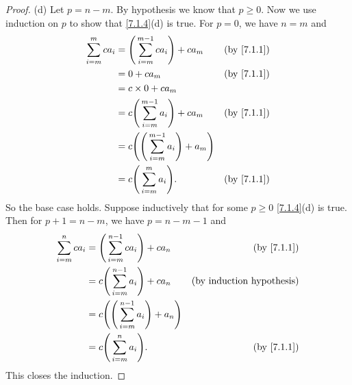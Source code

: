 \begin{proof}{(d)}
  Let \(p = n - m\).
  By hypothesis we know that \(p \geq 0\).
  Now we use induction on \(p\) to show that \cref{7.1.4}(d) is true.
  For \(p = 0\), we have \(n = m\) and
  \begin{align*}
    \sum_{i = m}^m ca_i & = \Bigg(\sum_{i = m}^{m - 1} ca_i\Bigg) + ca_m             & \text{(by \cref{7.1.1})} \\
                        & = 0 + ca_m                                                 & \text{(by \cref{7.1.1})} \\
                        & = c \times 0 + ca_m                                                                   \\
                        & = c \Bigg(\sum_{i = m}^{m - 1} a_i\Bigg) + ca_m            & \text{(by \cref{7.1.1})} \\
                        & = c \Bigg(\Bigg(\sum_{i = m}^{m - 1} a_i\Bigg) + a_m\Bigg)                            \\
                        & = c \Bigg(\sum_{i = m}^m a_i\Bigg).                        & \text{(by \cref{7.1.1})}
  \end{align*}
  So the base case holds.
  Suppose inductively that for some \(p \geq 0\) \cref{7.1.4}(d) is true.
  Then for \(p + 1 = n - m\), we have \(p = n - m - 1\) and
  \begin{align*}
    \sum_{i = m}^n ca_i & = \Bigg(\sum_{i = m}^{n - 1} ca_i\Bigg) + ca_n             & \text{(by \cref{7.1.1})}         \\
                        & = c \Bigg(\sum_{i = m}^{n - 1} a_i\Bigg) + ca_n            & \text{(by induction hypothesis)} \\
                        & = c \Bigg(\Bigg(\sum_{i = m}^{n - 1} a_i\Bigg) + a_n\Bigg)                                    \\
                        & = c \Bigg(\sum_{i = m}^n a_i\Bigg).                        & \text{(by \cref{7.1.1})}
  \end{align*}
  This closes the induction.
\end{proof}

